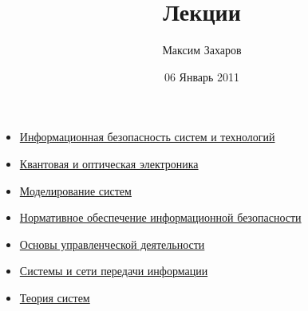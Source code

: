 \documentclass[12pt, russian, oneside, article]{ncc}
\begin{document}
\title{Лекции}
\author{Максим Захаров}
\date{06 Январь 2011}
\maketitle

\setcounter{tocdepth}{3}
\tableofcontents
\vspace*{1cm}

\begin{itemize}
\item \href{file:///home/maxim/Documents/Git/lectures/IBST_Lectures.org}{Информационная безопасность систем и технологий}
\item \href{file:///home/maxim/Documents/Git/lectures/KOE_Lectures.org}{Квантовая и оптическая электроника}
\item \href{file:///home/maxim/Documents/Git/lectures/MS_Lectures.org}{Моделирование систем}
\item \href{file:///home/maxim/Documents/Git/lectures/NOIB_Lectures.org}{Нормативное обеспечение информационной безопасности}
\item \href{file:///home/maxim/Documents/Git/lectures/OUD_Lectures.org}{Основы управленческой деятельности}
\item \href{file:///home/maxim/Documents/Git/lectures/SiSPI_Lectures.org}{Системы и сети передачи информации}
\item \href{file:///home/maxim/Documents/Git/lectures/TS_Lectures.org}{Теория систем}
\end{itemize}
\end{document}
